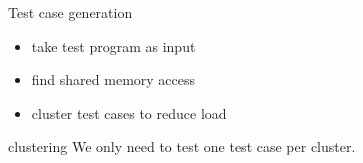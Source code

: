 \begin{frame}{Test case generation}{~}
\begin{itemize}
    \setlength\itemsep{1em}
    \item take test program as input
    \item find shared memory access
    \item cluster test cases to reduce load 
\end{itemize}
\begin{greenblock}{clustering}
We only need to test one test case per cluster.

\end{greenblock}

\end{frame}